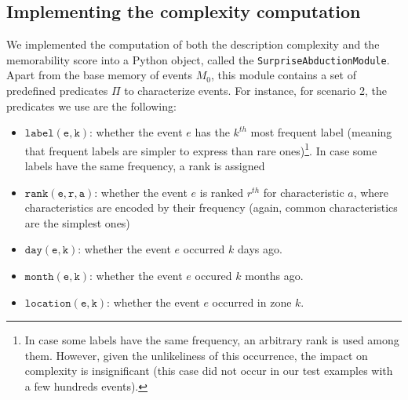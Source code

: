\documentclass[entropy,article,submit,moreauthors,pdftex]{Definitions/mdpi}
\begin{document}
\subsection{Implementing the complexity computation}

We implemented the computation of both the description complexity and the memorability score into a Python object, called the \texttt{SurpriseAbductionModule}. Apart from the base memory of events $M_0$, this module contains a set of predefined predicates $\Pi$ to characterize events. For instance, for scenario 2, the predicates we use are the following:
\begin{itemize}
    \item $\mathtt{label(e, k)}$: whether the event $e$ has the $k^{th}$ most frequent label (meaning that frequent labels are simpler to express than rare ones)\footnote{In case some labels have the same frequency, an arbitrary rank is used among them. However, given the unlikeliness of this occurrence, the impact on complexity is insignificant (this case did not occur in our test examples with a few hundreds events).}. In case some labels have the same frequency, a rank is assigned 
    \item $\mathtt{rank(e, r, a)}$: whether the event $e$ is ranked $r^{th}$ for characteristic $a$, where characteristics are encoded by their frequency (again, common characteristics are the simplest ones)
    \item $\mathtt{day(e, k)}$: whether the event $e$ occurred $k$ days ago.
    \item $\mathtt{month(e, k)}$: whether the event $e$ occured $k$ months ago.
    \item $\mathtt{location(e, k)}$: whether the event $e$ occurred in zone
          $k$.
\end{itemize}


\end{document}
